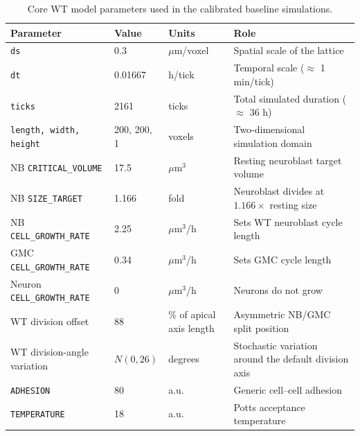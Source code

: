 \begin{table}[!htbp]
\centering
\caption{Core WT model parameters used in the calibrated baseline simulations.}
\label{tab:core-params}
\begin{tabular}{p{4.2cm}p{2.2cm}p{2.0cm}p{6.0cm}}
\toprule
Parameter & Value & Units & Role \\
\midrule
\texttt{ds} & 0.3 & \(\mu\mathrm{m}\)/voxel & Spatial scale of the lattice \\
\texttt{dt} & 0.01667 & h/tick & Temporal scale (\(\approx\) 1 min/tick) \\
\texttt{ticks} & 2161 & ticks & Total simulated duration (\(\approx\) 36 h) \\
\texttt{length, width, height} & 200, 200, 1 & voxels & Two-dimensional simulation domain \\
NB \texttt{CRITICAL\_VOLUME} & 17.5 & \(\mu\mathrm{m}^3\) & Resting neuroblast target volume \\
NB \texttt{SIZE\_TARGET} & 1.166 & fold & Neuroblast divides at \(1.166\times\) resting size \\
NB \texttt{CELL\_GROWTH\_RATE} & 2.25 & \(\mu\mathrm{m}^3\)/h & Sets WT neuroblast cycle length \\
GMC \texttt{CELL\_GROWTH\_RATE} & 0.34 & \(\mu\mathrm{m}^3\)/h & Sets GMC cycle length \\
Neuron \texttt{CELL\_GROWTH\_RATE} & 0 & \(\mu\mathrm{m}^3\)/h & Neurons do not grow \\
WT division offset & 88 & \% of apical axis length & Asymmetric NB/GMC split position \\
WT division-angle variation & \(N(0, 26)\) & degrees & Stochastic variation around the default division axis \\
\texttt{ADHESION} & 80 & a.u. & Generic cell--cell adhesion \\
\texttt{TEMPERATURE} & 18 & a.u. & Potts acceptance temperature \\
\bottomrule
\end{tabular}
\end{table}

